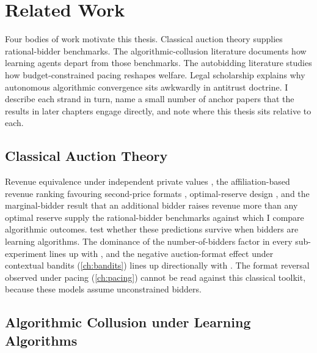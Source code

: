 \chapter{Related Work}
\label{ch:literature}

Four bodies of work motivate this thesis. Classical auction theory supplies rational-bidder benchmarks. The algorithmic-collusion literature documents how learning agents depart from those benchmarks. The autobidding literature studies how budget-constrained pacing reshapes welfare. Legal scholarship explains why autonomous algorithmic convergence sits awkwardly in antitrust doctrine. I describe each strand in turn, name a small number of anchor papers that the results in later chapters engage directly, and note where this thesis sits relative to each.

\section{Classical Auction Theory}
\label{sec:lit_classical}

Revenue equivalence under independent private values \citep{Vickrey1961}, the affiliation-based revenue ranking favouring second-price formats \citep{MilgromWeber1982}, optimal-reserve design \citep{Myerson1981}, and the marginal-bidder result that an additional bidder raises revenue more than any optimal reserve \citep{BulowKlemperer1996} supply the rational-bidder benchmarks against which I compare algorithmic outcomes.  test whether these predictions survive when bidders are learning algorithms. The dominance of the number-of-bidders factor in every sub-experiment lines up with \citet{BulowKlemperer1996}, and the negative auction-format effect under contextual bandits (\cref{ch:bandits}) lines up directionally with \citet{MilgromWeber1982}. The format reversal observed under pacing (\cref{ch:pacing}) cannot be read against this classical toolkit, because these models assume unconstrained bidders.

\section{Algorithmic Collusion under Learning Algorithms}
\label{sec:lit_algocollusion}

